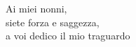 \hfill
\begin{minipage}[t]{0.47\textwidth}\raggedleft
	{\large{Ai miei nonni,\\
    siete forza e saggezza,\\
    a voi dedico il mio traguardo}{\normalsize\vspace{3mm}}}
\end{minipage}